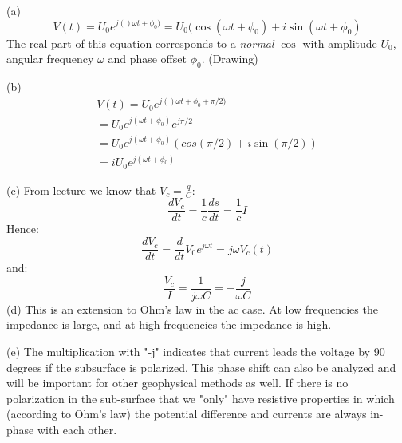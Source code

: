 \ifanswers
    \begin{tcolorbox}[enhanced jigsaw,breakable,pad at break*=1mm,
    colback=blue!5!white,colframe=babyblueeyes,title=Solutions,
    watermark color=white]
    (a)
    $$
    V(t) = U_0e^{j()\omega t+\phi_0)} = U_0 (\cos(\omega t+\phi_0)+i\sin(\omega t+\phi_0)
    $$
    The real part of this equation corresponds to a \textit{normal} $\cos$ with amplitude $U_0$, angular frequency $\omega$ and phase offset $\phi_0$. (Drawing)

    (b)
    \begin{eqnarray}
    V(t) = U_0e^{j()\omega t+\phi_0+\pi/2)}  \\
    = U_0e^{j(\omega t+\phi_0)}e^{j\pi/2} \\
    = U_0e^{j(\omega t+\phi_0)}(cos(\pi/2)+i\sin(\pi/2)) \\
    =i U_0e^{j(\omega t+\phi_0)}
    \end{eqnarray}
  

    (c)
    From lecture we know that $V_c = \frac{q}{C}$:
    $$
    \frac{dV_c}{dt} = \frac{1}{c}\frac{ds}{dt} = \frac{1}{c}I
    $$
    Hence:
    $$
    \frac{dV_c}{dt} = \frac{d}{dt}V_0e^{j\omega t}=j\omega V_c(t)
    $$
    and:
    $$
    \frac{V_c}{I} = \frac{1}{j\omega C} = -\frac{j}{\omega C}
    $$
    (d)
    This is an extension to Ohm's law in the ac case. At low frequencies the impedance is large, and at high frequencies the impedance is high. 
    
    (e) The multiplication with "-j" indicates that current leads the voltage by 90 degrees if the subsurface is polarized. This phase shift can also be analyzed and will be important for other geophysical methods as well. If there is no polarization in the sub-surface that we "only" have resistive properties in which (according to Ohm's law) the potential difference and currents are always in-phase with each other.

\end{tcolorbox}
\fi

